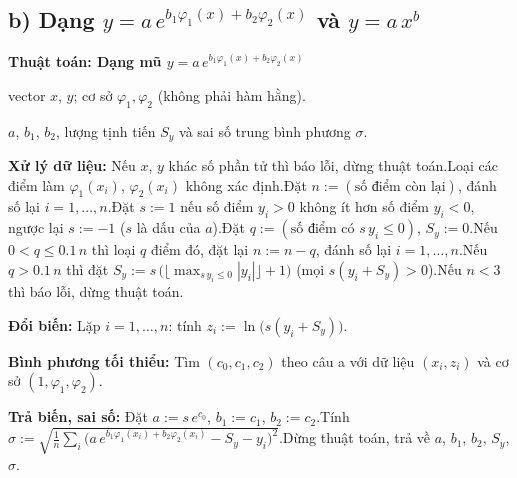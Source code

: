 \documentclass[11pt,a4paper]{article}
\newenvironment{thuattoan}[1]
  {\par\medskip\noindent\textbf{Thuật toán: #1}\begin{description}[style=standard,align=left,leftmargin=4.3em,labelwidth=3.9em,labelsep=0.4em,itemsep=1pt,topsep=3pt,font=\normalfont\bfseries]}
  {\end{description}}
\begin{document}
\subsection{b) Dạng $y=a\,e^{b_1\varphi_1(x)+b_2\varphi_2(x)}$ và $y=a\,x^b$}
\begin{thuattoan}{Dạng mũ $y=a\,e^{b_1\varphi_1(x)+b_2\varphi_2(x)}$}
\item[Input:] vector $x$, $y$; cơ sở $\varphi_1,\varphi_2$ (không phải hàm hằng).
\item[Output:] $a$, $b_1$, $b_2$, lượng tịnh tiến $S_y$ và sai số trung bình phương $\sigma$.
\item[Bước 0:] \textbf{Xử lý dữ liệu:} Nếu $x$, $y$ khác số phần tử thì báo lỗi, dừng thuật toán.\newline Loại các điểm làm $\varphi_1(x_i)$, $\varphi_2(x_i)$ không xác định.\newline Đặt $n:=(\text{số điểm còn lại})$, đánh số lại $i=1,\dots,n$.\newline Đặt $s:=1$ nếu số điểm $y_i>0$ không ít hơn số điểm $y_i<0$, ngược lại $s:=-1$ ($s$ là dấu của $a$).\newline Đặt $q:=(\text{số điểm có }s\,y_i\le0)$, $S_y:=0$.\newline Nếu $0<q\le0.1\,n$ thì loại $q$ điểm đó, đặt lại $n:=n-q$, đánh số lại $i=1,\dots,n$.\newline Nếu $q>0.1\,n$ thì đặt $S_y:=s\,\big(\lfloor\max_{s\,y_i\le0}|y_i|\rfloor+1\big)$ (mọi $s(y_i+S_y)>0$).\newline Nếu $n<3$ thì báo lỗi, dừng thuật toán.
\item[Bước 1:] \textbf{Đổi biến:} Lặp $i=1,\dots,n$: tính $z_i:=\ln\big(s(y_i+S_y)\big)$.
\item[Bước 2:] \textbf{Bình phương tối thiểu:} Tìm $(c_0,c_1,c_2)$ theo câu a với dữ liệu $(x_i,z_i)$ và cơ sở $(1,\varphi_1,\varphi_2)$.
\item[Bước 3:] \textbf{Trả biến, sai số:} Đặt $a:=s\,e^{c_0}$, $b_1:=c_1$, $b_2:=c_2$.\newline Tính $\sigma:=\sqrt{\frac1n\sum_i\big(a\,e^{b_1\varphi_1(x_i)+b_2\varphi_2(x_i)}-S_y-y_i\big)^2}$.\newline Dừng thuật toán, trả về $a$, $b_1$, $b_2$, $S_y$, $\sigma$.
\end{thuattoan}
\end{document}
